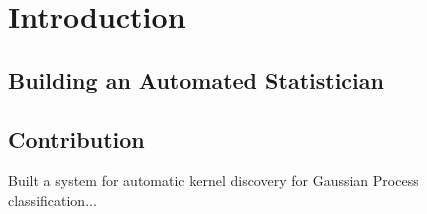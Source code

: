 \documentclass[a4paper,12pt ]{report}
\begin{document}
\pagestyle{empty}
\singlespacing

\onehalfspacing

\singlespacing


\clearpage

\setcounter{page}{0}
\pagestyle{plain}
\tableofcontents

\clearpage





\onehalfspacing


\chapter{Introduction}
\setcounter{page}{1} 

\section{Building an Automated Statistician}





\section{Contribution}

Built a system for automatic kernel discovery for Gaussian Process classification...


\clearpage


\end{document}
